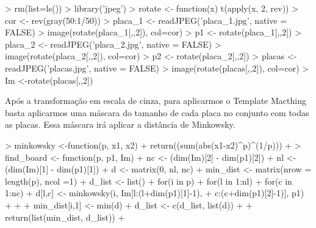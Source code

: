 \documentclass[12pt]{article}
\begin{document}
\begin{Schunk}
\begin{Sinput}
> rm(list=ls())
> library('jpeg')
> rotate <- function(x) t(apply(x, 2, rev))
> cor <- rev(gray(50:1/50))
> placa_1 <- readJPEG('placa_1.jpg', native = FALSE)
> image(rotate(placa_1[,,2]), col=cor)
> p1 <- rotate(placa_1[,,2])
> placa_2 <- readJPEG('placa_2.jpg', native = FALSE)
> image(rotate(placa_2[,,2]), col=cor)
> p2 <- rotate(placa_2[,,2])
> placas <- readJPEG('placas.jpg', native = FALSE)
> image(rotate(placas[,,2]), col=cor)
> Im <-rotate(placas[,,2])
\end{Sinput}
\end{Schunk}

  \par Após a transformação em escala de cinza, para aplicarmos o Template Macthing basta aplicarmos uma máscara do tamanho de cada placa no conjunto com todas as placas. Essa máscara irá aplicar a distância de Minkowsky. 

\begin{Schunk}
\begin{Sinput}
> minkowsky <-function(p, x1, x2){
+   return((sum(abs(x1-x2)^p)^(1/p)))
+ }
> find_board <- function(p, p1, Im){
+   nc <- (dim(Im)[2] - dim(p1)[2])
+   nl <- (dim(Im)[1] - dim(p1)[1])
+   d <- matrix(0, nl, nc)
+   min_dist <- matrix(nrow = length(p), ncol =1)
+   d_list <- list()
+   for(i in p){
+     for(l in 1:nl){
+       for(c in 1:nc){
+         d[l,c] <- minkowsky(i, Im[l:(l+dim(p1)[1]-1), 
+                                   c:(c+dim(p1)[2]-1)], p1)
+       }
+     }
+     min_dist[i,1] <- min(d)
+     d_list <- c(d_list, list(d))
+   }
+   return(list(min_dist, d_list))
+ }
\end{Sinput}
\end{Schunk}
\end{document}
